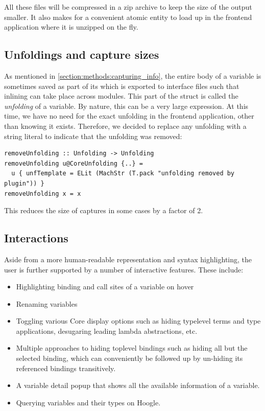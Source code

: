 All these files will be compressed in a zip archive to keep the size of the output smaller. It also makes for
a convenient atomic entity to load up in the frontend application where it is unzipped on the fly.

\subsection{Unfoldings and capture sizes}

As mentioned in \cref{section:methods:capturing_info}, the entire body of a variable is sometimes saved as part
of its  which is exported to interface files such that inlining can take place across modules.
This part of the  struct is called the \textit{unfolding} of a variable.
By nature, this can be a very large expression. At this time, we have no
need for the exact unfolding in the frontend application, other than knowing it exists. Therefore, we decided 
to replace any unfolding with a string literal to indicate that the unfolding was removed:

\begin{listing}[H]
\begin{verbatim}
removeUnfolding :: Unfolding -> Unfolding
removeUnfolding u@CoreUnfolding {..} = 
  u { unfTemplate = ELit (MachStr (T.pack "unfolding removed by plugin")) }
removeUnfolding x = x
\end{verbatim}
\end{listing}

This reduces the size of captures in some cases by a factor of 2.

\subsection{Interactions}

Aside from a more human-readable representation and syntax highlighting, the user is further supported by
a number of interactive features. These include:

\begin{itemize}
  \item Highlighting binding and call sites of a variable on hover
  \item Renaming variables
  \item Toggling various Core display options such as hiding typelevel terms and type applications, desugaring
        leading lambda abstractions, etc.
  \item Multiple approaches to hiding toplevel bindings such as hiding all but the selected binding, which
        can conveniently be followed up by un-hiding its referenced bindings transitively.
  \item A variable detail popup that shows all the available information of a variable.
  \item Querying variables and their types on Hoogle.
\end{itemize}

